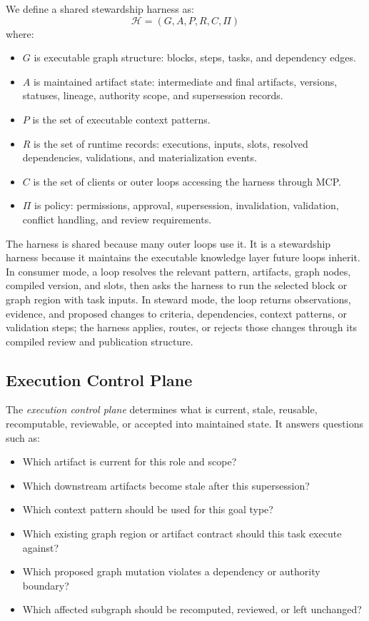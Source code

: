 \documentclass{article}
\begin{document}
We define a shared stewardship harness as:
\begin{equation}
\mathcal{H} = (G, A, P, R, C, \Pi)
\end{equation}
where:
\begin{itemize}[leftmargin=*]
\item $G$ is executable graph structure: blocks, steps, tasks, and dependency edges.
\item $A$ is maintained artifact state: intermediate and final artifacts, versions, statuses, lineage, authority scope, and supersession records.
\item $P$ is the set of executable context patterns.
\item $R$ is the set of runtime records: executions, inputs, slots, resolved dependencies, validations, and materialization events.
\item $C$ is the set of clients or outer loops accessing the harness through MCP.
\item $\Pi$ is policy: permissions, approval, supersession, invalidation, validation, conflict handling, and review requirements.
\end{itemize}

The harness is shared because many outer loops use it. It is a stewardship harness because it maintains the executable knowledge layer future loops inherit. In consumer mode, a loop resolves the relevant pattern, artifacts, graph nodes, compiled version, and slots, then asks the harness to run the selected block or graph region with task inputs. In steward mode, the loop returns observations, evidence, and proposed changes to criteria, dependencies, context patterns, or validation steps; the harness applies, routes, or rejects those changes through its compiled review and publication structure.

\subsection{Execution Control Plane}

The \emph{execution control plane} determines what is current, stale, reusable, recomputable, reviewable, or accepted into maintained state. It answers questions such as:
\begin{itemize}[leftmargin=*]
\item Which artifact is current for this role and scope?
\item Which downstream artifacts become stale after this supersession?
\item Which context pattern should be used for this goal type?
\item Which existing graph region or artifact contract should this task execute against?
\item Which proposed graph mutation violates a dependency or authority boundary?
\item Which affected subgraph should be recomputed, reviewed, or left unchanged?
\end{itemize}
\end{document}
